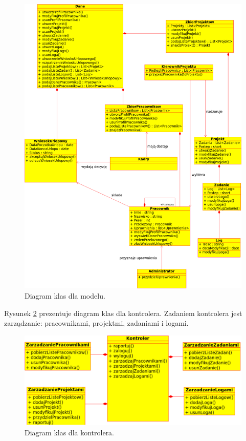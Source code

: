 \begin{figure}[h]
    \centering
    \includegraphics[scale=0.5]{diagramy/modelKlas/ModelDiagramKlas}
    \caption{Diagram klas dla modelu.}
    \label{fig:ModelDiagramKlas}
\end{figure}

Rysunek \ref{fig:KontrolerDiagramKlas} prezentuje diagram klas dla kontrolera. Zadaniem kontrolera jest zarządzanie: pracownikami, projektmi, zadaniami i logami.

\begin{figure}[h]
    \centering
    \includegraphics[scale=0.7]{diagramy/modelKlas/KontrolerDiagramKlas}
    \caption{Diagram klas dla kontrolera.}
    \label{fig:KontrolerDiagramKlas}
\end{figure}

